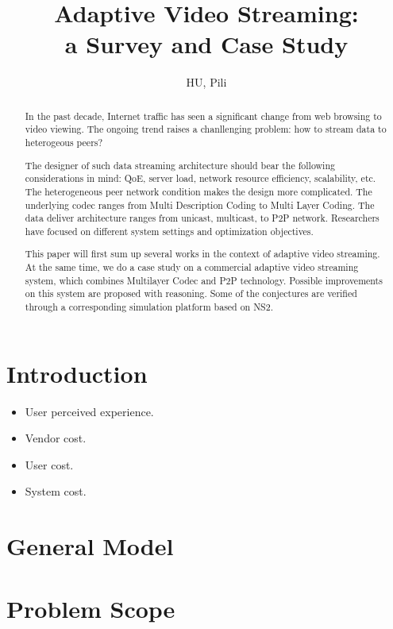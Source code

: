 \documentclass[11pt,a4paper]{article}
\author{HU, Pili}
\title{Adaptive Video Streaming: 
 \\a Survey and Case Study}
\begin{document}
\maketitle

\begin{abstract}
	In the past decade, Internet traffic has seen a significant 
	change from web browsing to video viewing. The ongoing trend 
	raises a chanllenging problem: how to stream data to heterogeous 
	peers? 
	
	The designer of such data streaming architecture should 
	bear the following considerations in mind: QoE, server load, 
	network resource efficiency, scalability, etc. The heterogeneous 
	peer network condition makes the design more complicated. The 
	underlying codec ranges from Multi Description Coding to Multi 
	Layer Coding. The data deliver architecture ranges from unicast,
	multicast, to P2P network. Researchers have focused on different 
	system settings and optimization objectives. 
	 
	This paper will first
	sum up several works in the context of adaptive video streaming. 
	At the same time, we do a case study on a commercial adaptive 
	video streaming system, which combines Multilayer Codec and P2P 
	technology. Possible improvements on this system are proposed
	with reasoning. Some of the conjectures are
	verified through a corresponding simulation platform based on NS2. 
\end{abstract}

\pagebreak
\tableofcontents
\pagebreak

\section{Introduction}



\begin{itemize}
	\item User perceived experience. 
	\item Vendor cost. 
	\item User cost. 
	\item System cost. 
\end{itemize}

\section{General Model}


\section{Problem Scope}
\end{document}
